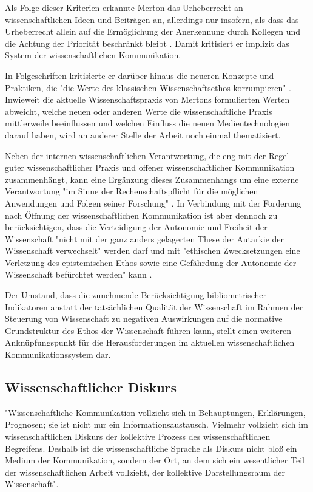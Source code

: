 Als Folge dieser Kriterien erkannte Merton das Urheberrecht an wissenschaftlichen Ideen und Beiträgen an, allerdings nur insofern, als dass das Urheberrecht allein auf die Ermöglichung der Anerkennung durch Kollegen und die Achtung der Priorität beschränkt bleibt \cite{Fangerau_2014}. Damit kritisiert er implizit das System der wissenschaftlichen Kommunikation.

In Folgeschriften kritisierte er darüber hinaus die neueren Konzepte und Praktiken, die "die Werte des klassischen Wissenschaftsethos korrumpieren" \cite{Froehlich_2009}. Inwieweit die aktuelle Wissenschaftspraxis von Mertons formulierten Werten abweicht, welche neuen oder anderen Werte die wissenschaftliche Praxis mittlerweile beeinflussen und welchen Einfluss die neuen Medientechnologien darauf haben, wird an anderer Stelle der Arbeit noch einmal thematisiert.

Neben der internen wissenschaftlichen Verantwortung, die eng mit der Regel guter wissenschaftlicher Praxis und offener wissenschaftlicher Kommunikation zusammenhängt, kann eine Ergänzung dieses Zusammenhangs um eine externe Verantwortung "im Sinne der Rechenschaftspflicht für die möglichen Anwendungen und Folgen seiner Forschung" \cite[:69]{Oezmen_2015}. In Verbindung mit der Forderung nach Öffnung der wissenschaftlichen Kommunikation ist aber dennoch zu berücksichtigen, dass die Verteidigung der Autonomie und Freiheit der Wissenschaft "nicht mit der ganz anders gelagerten These der Autarkie der Wissenschaft verwechselt" werden darf und mit "ethischen Zwecksetzungen eine Verletzung des epistemischen Ethos sowie eine Gefährdung der Autonomie der Wissenschaft befürchtet werden" kann \cite[:69]{Oezmen_2015}.

Der Umstand, dass die zunehmende Berücksichtigung bibliometrischer Indikatoren anstatt der tatsächlichen Qualität der Wissenschaft im Rahmen der Steuerung von Wissenschaft zu negativen Auswirkungen auf die normative Grundstruktur des Ethos der Wissenschaft führen kann, stellt einen weiteren Anknüpfungspunkt für die Herausforderungen im aktuellen wissenschaftlichen Kommunikationssystem dar.

\subsection{Wissenschaftlicher Diskurs}

"Wissenschaftliche Kommunikation vollzieht sich in Behauptungen, Erklärungen, Prognosen; sie ist nicht nur ein Informationsaustausch. Vielmehr vollzieht sich im wissenschaftlichen Diskurs der kollektive Prozess des wissenschaftlichen Begreifens. Deshalb ist die wissenschaftliche Sprache als Diskurs nicht bloß ein Medium der Kommunikation, sondern der Ort, an dem sich ein wesentlicher Teil der wissenschaftlichen Arbeit vollzieht, der kollektive Darstellungsraum der Wissenschaft". \cite[:95]{Boehme_1978}

